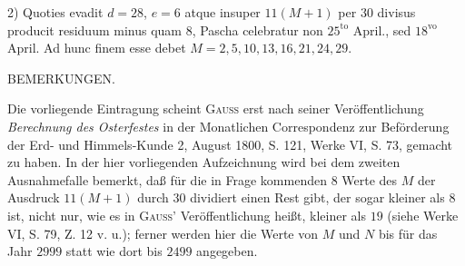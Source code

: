 2) Quoties evadit $d=28$, $e=6$ atque insuper $11(M+1)$ per $30$ divisus producit residuum minus quam $8$, Pascha celebratur non $25^{\mathrm{to}}$ April., sed $18^{\mathrm{vo}}$ April. Ad hunc finem esse debet $M=2,\allowbreak 5,\allowbreak 10,\allowbreak 13,\allowbreak 16,\allowbreak 21,\allowbreak 24,\allowbreak 29$.

\begin{center}\small BEMERKUNGEN.\end{center}
\begingroup\small
\noindent\hspace*{\parindent}Die vorliegende Eintragung scheint \textsc{Gauss} erst nach seiner Veröffentlichung \textit{Berechnung des Osterfestes} in der Monatlichen Correspondenz zur Beförderung der Erd- und Himmels-Kunde 2, August 1800, S. 121, Werke VI, S. 73, gemacht zu haben. In der hier vorliegenden Aufzeichnung wird bei dem zweiten Ausnahmefalle bemerkt, daß für die in Frage kommenden $8$ Werte des $M$ der Ausdruck $11(M+1)$ durch $30$ dividiert einen Rest gibt, der sogar kleiner als $8$ ist, nicht nur, wie es in \textsc{Gauss}' Veröffentlichung heißt,
\clearpage{}
\noindent kleiner als $19$ (siehe Werke VI, S. 79, Z. 12 v. u.); ferner werden hier die Werte von $M$ und $N$ bis für das Jahr $2999$ statt wie dort bis $2499$ angegeben.

